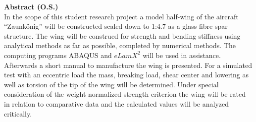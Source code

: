 

\noindent\large{\textbf{Abstract (O.S.)}}~\\

\noindent In the scope of this student research project a model half-wing of the aircraft “Zaunkönig” will be constructed scaled down to 1:4.7 as a glass fibre spar structure. The wing will be construed for strength and bending stiffness using analytical methods as far as possible, completed by numerical methods. The computing programs ABAQUS and $ eLamX^{2} $ will be used in assistance. Afterwards a short manual to manufacture the wing is presented. For a simulated test with an eccentric load the mass, breaking load, shear center and lowering as well as torsion of the tip of the wing will be determined. Under special consideration of the weight normalized strength criterion the wing will be rated in relation to comparative data and the calculated values will be analyzed critically.
